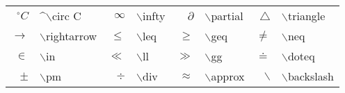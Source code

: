 \documentclass[a4paper, 12pt]{report}
\begin{document}
	\begin{table}
		\centering
		\begin{tabular}{rlrlrlrl}
			\hline
			$^\circ C$ & \textasciicircum$\backslash$circ C & $\infty$ & $\backslash$infty & $\partial$ & $\backslash$partial & $\triangle$ & $\backslash$triangle\\
			$\rightarrow$ & $\backslash$rightarrow & $\leq$ & $\backslash$leq & $\geq$ & $\backslash$geq & $\neq$ & $\backslash$neq\\
			$\in$ & $\backslash$in & $\ll$ & $\backslash$ll & $\gg$ & $\backslash$gg & $\doteq$ & $\backslash$doteq\\
			$\pm$ & $\backslash$pm & $\div$ & $\backslash$div & $\approx$ & $\backslash$approx & $\backslash$ & $\backslash$backslash\\
			\hline
		\end{tabular}
	\end{table}
	
\end{document}
